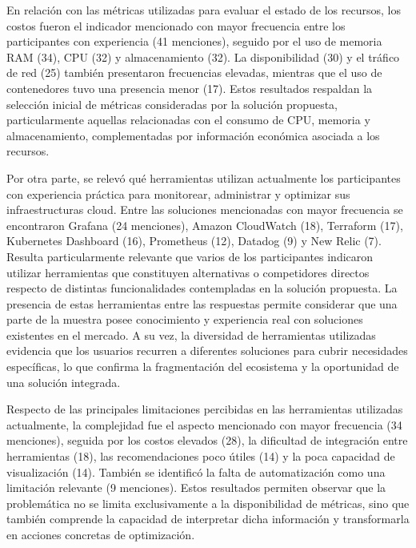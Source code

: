 \documentclass[a4paper, 12pt, oneside, openany]{book}
\begin{document}
En relación con las métricas utilizadas para evaluar el estado de los recursos, los costos fueron el indicador mencionado con mayor frecuencia entre los participantes con experiencia (41 menciones), seguido por el uso de memoria RAM (34), CPU (32) y almacenamiento (32). La disponibilidad (30) y el tráfico de red (25) también presentaron frecuencias elevadas, mientras que el uso de contenedores tuvo una presencia menor (17). Estos resultados respaldan la selección inicial de métricas consideradas por la solución propuesta, particularmente aquellas relacionadas con el consumo de CPU, memoria y almacenamiento, complementadas por información económica asociada a los recursos.

Por otra parte, se relevó qué herramientas utilizan actualmente los participantes con experiencia práctica para monitorear, administrar y optimizar sus infraestructuras cloud. Entre las soluciones mencionadas con mayor frecuencia se encontraron Grafana (24 menciones), Amazon CloudWatch (18), Terraform (17), Kubernetes Dashboard (16), Prometheus (12), Datadog (9) y New Relic (7). Resulta particularmente relevante que varios de los participantes indicaron utilizar herramientas que constituyen alternativas o competidores directos respecto de distintas funcionalidades contempladas en la solución propuesta. La presencia de estas herramientas entre las respuestas permite considerar que una parte de la muestra posee conocimiento y experiencia real con soluciones existentes en el mercado. A su vez, la diversidad de herramientas utilizadas evidencia que los usuarios recurren a diferentes soluciones para cubrir necesidades específicas, lo que confirma la fragmentación del ecosistema y la oportunidad de una solución integrada.

Respecto de las principales limitaciones percibidas en las herramientas utilizadas actualmente, la complejidad fue el aspecto mencionado con mayor frecuencia (34 menciones), seguida por los costos elevados (28), la dificultad de integración entre herramientas (18), las recomendaciones poco útiles (14) y la poca capacidad de visualización (14). También se identificó la falta de automatización como una limitación relevante (9 menciones). Estos resultados permiten observar que la problemática no se limita exclusivamente a la disponibilidad de métricas, sino que también comprende la capacidad de interpretar dicha información y transformarla en acciones concretas de optimización.
\end{document}
